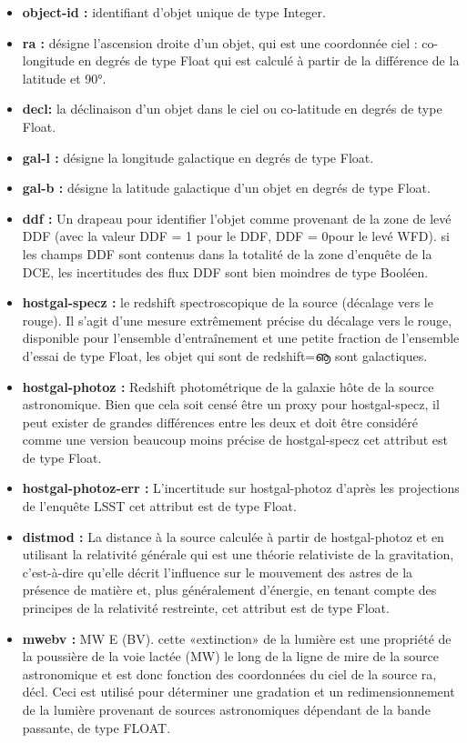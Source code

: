 \begin{itemize}
    \item \textbf{object-id :} identifiant d’objet unique de type Integer.
    \item \textbf{ra :} désigne l’ascension droite d’un objet, qui est une coordonnée ciel : co-longitude en degrés de type Float qui est calculé à partir de la différence de la latitude et 90°.
    \item \textbf{ decl:} la déclinaison d’un objet dans le ciel ou co-latitude en degrés de type Float.
    \item \textbf{ gal-l :} désigne la longitude galactique en degrés de type Float.
    \item \textbf{gal-b : }désigne la latitude galactique d’un objet en degrés de type Float.
    \item \textbf{ ddf :} Un drapeau pour identifier l’objet comme provenant de la zone de levé DDF (avec la valeur DDF = 1 pour le DDF, DDF = 0pour le levé WFD). si les champs DDF sont contenus dans la totalité de la zone d’enquête de la DCE, les incertitudes des flux DDF sont bien moindres de type Booléen.
    \item \textbf{ hostgal-specz : }le redshift spectroscopique de la source (décalage vers le rouge). Il s’agit d’une mesure extrêmement précise du décalage vers le rouge, disponible pour l’ensemble d’entraînement et une petite fraction de l’ensemble d’essai de type Float, les objet qui sont de redshift=ൡ sont galactiques.
    \item \textbf{hostgal-photoz :} Redshift photométrique de la galaxie hôte de la source astronomique. Bien que cela soit censé être un proxy pour hostgal-specz, il peut exister de grandes différences entre les deux et doit être considéré comme une version beaucoup moins précise de hostgal-specz cet attribut est de type Float.
    \item \textbf{hostgal-photoz-err :} L’incertitude sur hostgal-photoz d’après les projections de l’enquête LSST cet attribut est de type Float.
    \item \textbf{distmod :} La distance à la source calculée à partir de hostgal-photoz et en utilisant la relativité générale qui est une théorie relativiste de la gravitation, c’est-à-dire qu’elle décrit l’influence sur le mouvement des astres de la présence de matière et, plus généralement d’énergie, en tenant compte des principes de la relativité restreinte, cet attribut est de type Float.
    \item\textbf{mwebv :} MW E (BV). cette «extinction» de la lumière est une propriété de la poussière de la voie lactée (MW) le long de la ligne de mire de la source astronomique et est donc fonction des coordonnées du ciel de la source ra, décl. Ceci est utilisé pour déterminer une gradation et un redimensionnement de la lumière provenant de sources astronomiques dépendant de la bande passante, de type FLOAT.

\end{itemize}
